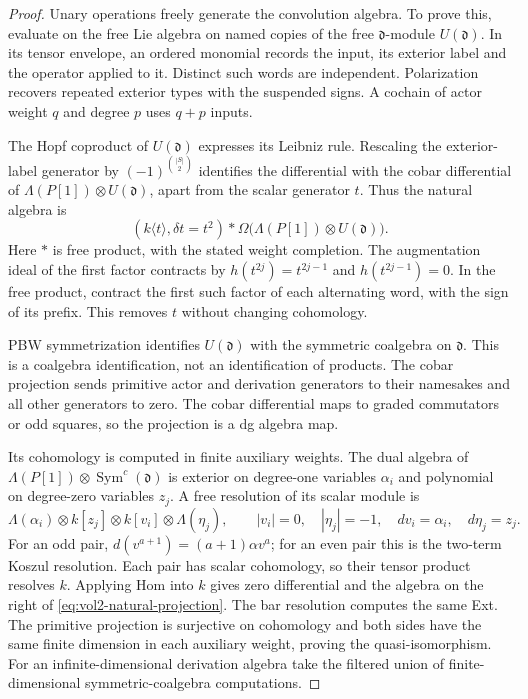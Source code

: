\begin{proof}
Unary operations freely generate the convolution algebra. To prove
this, evaluate on the free Lie algebra on named copies of the free
$\mathfrak d$-module $U(\mathfrak d)$. In its tensor envelope,
an ordered monomial records the input, its exterior label and the
operator applied to it. Distinct such words are independent.
Polarization recovers repeated exterior types with the suspended
signs. A cochain of actor weight $q$ and degree $p$ uses $q+p$
inputs.

The Hopf coproduct of $U(\mathfrak d)$ expresses its Leibniz rule.
Rescaling the exterior-label generator by
$(-1)^{\binom{|S|}{2}}$ identifies the differential with the cobar
differential of $\Lambda(P[1])\otimes U(\mathfrak d)$, apart from
the scalar generator $t$. Thus the natural algebra is
\begin{equation}\label{eq:vol2-natural-cobar}
 (k\langle t\rangle,\delta t=t^2)
       *\Omega\bigl(\Lambda(P[1])\otimes U(\mathfrak d)\bigr).
\end{equation}
Here $*$ is free product, with the stated weight completion.
The augmentation ideal of the first factor contracts by
$h(t^{2j})=t^{2j-1}$ and $h(t^{2j-1})=0$. In the free product,
contract the first such factor of each alternating word, with
the sign of its prefix. This removes $t$ without changing
cohomology.

PBW symmetrization identifies $U(\mathfrak d)$ with the symmetric
coalgebra on $\mathfrak d$. This is a coalgebra identification,
not an identification of products. The cobar projection sends
primitive actor and derivation generators to their namesakes and
all other generators to zero. The cobar differential maps to
graded commutators or odd squares, so the projection is a dg
algebra map.

Its cohomology is computed in finite auxiliary weights. The dual
algebra of $\Lambda(P[1])\otimes\operatorname{Sym}^c(\mathfrak d)$
is exterior on degree-one variables $\alpha_i$ and polynomial on
degree-zero variables $z_j$. A free resolution of its scalar
module is
\[
 \Lambda(\alpha_i)\otimes k[z_j]
       \otimes k[v_i]\otimes\Lambda(\eta_j),\qquad
 |v_i|=0,\quad |\eta_j|=-1,\quad
 dv_i=\alpha_i,\quad d\eta_j=z_j.
\]
For an odd pair, $d(v^{a+1})=(a+1)\alpha v^a$; for an even
pair this is the two-term Koszul resolution. Each pair has scalar
cohomology, so their tensor product resolves $k$. Applying Hom
into $k$ gives zero differential and the algebra on the right
of \eqref{eq:vol2-natural-projection}. The bar resolution computes
the same Ext. The primitive projection is surjective on
cohomology and both sides have the same finite dimension in each
auxiliary weight, proving the quasi-isomorphism. For an
infinite-dimensional derivation algebra take the filtered union
of finite-dimensional symmetric-coalgebra computations.


\end{proof}
